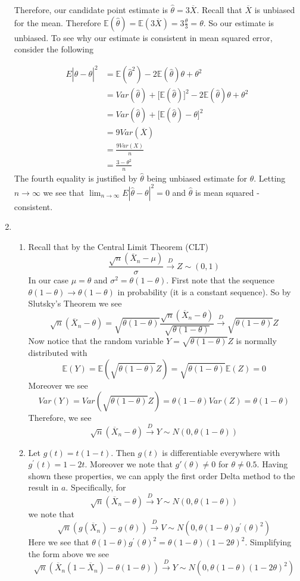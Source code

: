 \documentclass[12pt]{article}  %
\newcommand{\E}{{\mathbb{E}}}
\begin{document}
\begin{enumerate}
Therefore, our candidate point estimate is $\widehat{\theta} = 3\overline{X}$. Recall that $\overline{X}$ is unbiased for the mean. Therefore $\E(\widehat{\theta}) = \E(3\overline{X}) = 3\frac{\theta}{3} = \theta$. So our estimate is unbiased. To see why our estimate is consistent in mean squared error, consider the following 

\begin{align*}
E|\widehat{\theta}-\theta|^2 &= \E(\widehat{\theta}^2) - 2\E(\widehat{\theta})\theta +\theta^2\\
&= Var(\widehat{\theta}) + \big[\E(\widehat{\theta})\big]^2 - 2\E(\widehat{\theta})\theta + \theta^2\\
&= Var(\widehat{\theta}) + \big[\E(\widehat{\theta}) - \theta\big]^2\\
&= 9Var(\overline{X})\\
&= \frac{9Var(X)}{n}\\
&= \frac{3-\theta^2}{n}
\end{align*}
The fourth equality is justified by $\widehat{\theta}$ being unbiased estimate for $\theta$. Letting $n\to \infty$ we see that $\lim_{n\to\infty}E|\widehat{\theta}-\theta|^2 = 0$ and $\widehat{\theta}$ is mean squared - consistent. 


\item 
\begin{enumerate}
\item Recall that by the Central Limit Theorem (CLT) $$\frac{\sqrt{n}(\overline{X}_n - \mu)}{\sigma}\overset{D}{\to}Z\sim(0,1)$$ In our case $\mu = \theta$ and $\sigma^2 = \theta(1-\theta)$. First note that the sequence $\theta(1-\theta) \to \theta(1-\theta)$ in probability (it is a constant sequence). So by Slutsky's Theorem we see $$\sqrt{n}(\overline{X}_n - \theta) = \sqrt{\theta(1-\theta)}\frac{\sqrt{n}(\overline{X}_n -\theta)}{\sqrt{\theta(1-\theta)}} \overset{D}{\to} \sqrt{\theta(1-\theta)}Z$$ Now notice that the random variable $Y = \sqrt{\theta(1-\theta)}Z$ is normally distributed with $$\E(Y) = \E(\sqrt{\theta(1-\theta)}Z) = \sqrt{\theta(1-\theta)}\E(Z) = 0 $$ Moreover we see $$Var(Y) = Var(\sqrt{\theta(1-\theta)}Z) = \theta(1-\theta)Var(Z) = \theta(1-\theta)$$ Therefore, we see $$\sqrt{n}(\overline{X}_n - \theta) \overset{D}{\longrightarrow} Y\sim N(0, \theta(1-\theta))$$

\item Let $g(t) = t(1-t)$. Then $g(t)$ is differentiable everywhere with $g^{'}(t) = 1-2t$. Moreover we note that $g'(\theta)\neq 0$ for $\theta\neq 0.5$. Having shown these properties, we can apply the first order Delta method to the result in $a$. Specifically, for $$\sqrt{n}(\overline{X}_n - \theta) \overset{D}{\longrightarrow} Y\sim N(0, \theta(1-\theta))$$ we note that $$\sqrt{n}(g(\overline{X}_n) - g(\theta)) \overset{D}{\longrightarrow} V\sim N(0, \theta(1-\theta)g^{'}(\theta)^2)$$ Here we see that $\theta(1-\theta)g^{'}(\theta)^2 = \theta(1-\theta)(1 - 2\theta)^2$. Simplifying the form above we see $$\sqrt{n}(\overline{X}_n(1-\overline{X}_n) - \theta(1 - \theta)) \overset{D}{\longrightarrow} Y\sim N(0, \theta(1-\theta)(1-2\theta)^2)$$


\end{enumerate}
\end{enumerate}
\end{document}
